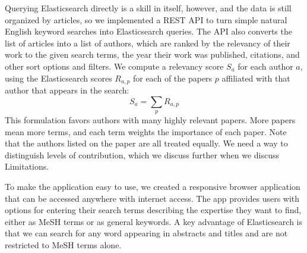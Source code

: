 Querying Elasticsearch directly is a skill in itself, however, and the data is still organized by articles, so we implemented a REST API to turn simple natural English keyword searches into Elasticsearch queries. The API also converts the list of articles into a list of authors, which are ranked by the relevancy of their work to the given search terms, the year their work was published, citations, and other sort options and filters. We compute a relevancy score $S_a$ for each author $a$, using the Elasticsearch scores $R_{a, p}$ for each of the papers $p$ affiliated with that author that appears in the search:
$$
S_a = \sum_{p} R_{a, p}
$$
This formulation favors authors with many highly relevant papers. More papers mean more terms, and each term weights the importance of each paper. Note that the authors listed on the paper are all treated equally. We need a way to distinguish levels of contribution, which we discuss further when we discuss Limitations. 

To make the application easy to use, we created a responsive browser application that can be accessed anywhere with internet access. The app provides users with options for entering their search terms describing the expertise they want to find, either as MeSH terms or as general keywords. A key advantage of Elasticsearch is that we can search for any word appearing in abstracts and titles and are not restricted to MeSH terms alone. 